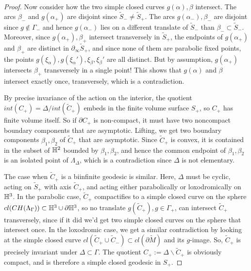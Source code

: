\documentclass[12pt]{amsart}
\theoremstyle{definition}
\theoremstyle{remark}
\begin{document}
\begin{proof}
	Now consider how the two simple closed curves $g(\alpha),\beta$ intersect. The arcs $\beta_-$ and $g(\alpha_+)$ are disjoint since $\tilde S_-\neq \tilde S_+$. The arcs $g(\alpha_-),\beta_-$ are disjoint since $g\not\in \Gamma_-$ and hence $g(\alpha_-)$ lies on a different translate of $\tilde S_-$ than $\beta_- \subset \tilde S_-$. Moreover, since $g(\alpha_+),\beta_+$ intersect transversely in $\tilde S_+$, the endpoints of $g(\alpha_+)$ and $\beta_+$ are distinct in $\partial_\infty \tilde S_+$, and since none of them are parabolic fixed points, the points $g(\xi_\alpha),g(\xi_\alpha'),\xi_\beta,\xi_\beta'$ are all distinct. But by assumption, $g(\alpha_+)$ intersects $\beta_+$ transversely in a single point! This shows that $g(\alpha)$ and $\beta$ intersect exactly once, transversely, which is a contradiction.
	
		By precise invariance of the action on the interior, the quotient $int(C_+)=\Delta / int(\tilde C_+)$ embeds in the finite volume surface $S_+$, so $C_+$ has finite volume itself.  So if $\partial C_+$ is non-compact, it must have two noncompact boundary components that are asymptotic. Lifting, we get two boundary components $\beta_1,\beta_2$ of $\tilde C_+$ that are asymptotic. Since $\tilde C_+$ is convex, it is contained in the subset of $\mathbb H^2$ bounded by $\beta_1,\beta_2$, and hence the common endpoint of $\beta_1,\beta_2$ is an isolated point of $\Lambda_\Delta$, which is a contradiction since $\Delta$ is not elementary.
		
		\medskip
		
	
	The case when $\tilde C_+$ is a biinfinite geodesic is similar. Here, $\Delta$ must be cyclic, acting on $\tilde S_+$ with axis $\tilde C_+$, and acting either parabolically or loxodromically on $\mathbb H^3$. In the parabolic case, $\tilde C_+$ compactifies to a simple closed curve on the sphere $cl(CH(\Lambda_\Gamma))\subset \mathbb H^3 \cup \partial \mathbb H^3$, so no translate $g(\tilde C_+), g\in \Gamma_+$, can intersect $\tilde C_+$ transversely, since if it did we'd get two simple closed curves on the sphere that intersect once. In the loxodromic case, we get a similar contradiction by looking at the simple closed curve $cl(\tilde C_+ \cup \tilde C_-) \subset cl(\partial \tilde M)$ and its $g$-image. So, $\tilde C_+$ is precisely invariant under $\Delta \subset \Gamma$. The quotient $C_+ := \Delta \backslash \tilde C_+$ is obviously compact, and is therefore a simple closed geodesic in $S_+$.
\end{proof}
\end{document}
